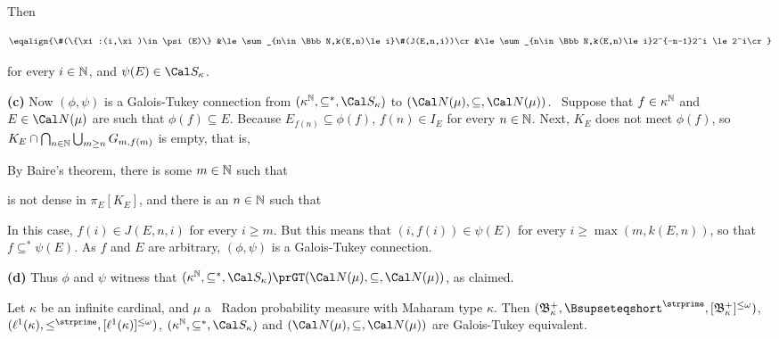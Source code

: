 {

\noindent Then

$$\eqalign{\#(\{\xi:(i,\xi)\in\psi(E)\}
&\le\sum_{n\in\Bbb N,k(E,n)\le i}\#(J(E,n,i))\cr
&\le\sum_{n\in\Bbb N,k(E,n)\le i}2^{-n-1}2^i
\le 2^i\cr}$$

\noindent for every $i\in\Bbb N$, and $\psi(E)\in\Cal S_{\kappa}$.

\medskip

{\bf (c)} Now $(\phi,\psi)$ is a Galois-Tukey connection from
$(\kappa^{\Bbb N},\subseteq^*,\Cal S_{\kappa})$ to
$(\Cal N(\mu),\subseteq,\Cal N(\mu))$.   \Prf\ Suppose that
$f\in\kappa^{\Bbb N}$ and $E\in\Cal N(\mu)$ are such that
$\phi(f)\subseteq E$.   Because $E_{f(n)}\subseteq\phi(f)$,
$f(n)\in I_E$ for every $n\in\Bbb N$.   Next, $K_E$ does not meet
$\phi(f)$, so $K_E\cap\bigcap_{n\in\Bbb N}\bigcup_{m\ge n}G_{m,f(m)}$ is
empty, that is,


\noindent By Baire's theorem, there is some $m\in\Bbb N$ such that


\noindent is not dense in $\pi_E[K_E]$, and there is an $n\in\Bbb N$
such that


\noindent In this case, $f(i)\in J(E,n,i)$ for every $i\ge m$.   But
this means that $(i,f(i))\in\psi(E)$ for every $i\ge\max(m,k(E,n))$, so
that $f\subseteq^*\psi(E)$.   As $f$ and $E$ are arbitrary,
$(\phi,\psi)$ is a Galois-Tukey connection.\ \Qed

\medskip

{\bf (d)} Thus $\phi$ and $\psi$ witness that
$(\kappa^{\Bbb N},\subseteq^*,\Cal S_{\kappa})
\prGT(\Cal N(\mu),\subseteq,\Cal N(\mu))$, as claimed.
}%

 Let $\kappa$ be an infinite cardinal, and $\mu$
a \Mth\ Radon probability measure with Maharam type $\kappa$.
Then $(\frak B_{\kappa}^+,\Bsupseteqshort^{\strprime},
  [\frak B_{\kappa}^+]^{\le\omega})$,
$(\ell^1(\kappa),
  \le^{\strprime},\penalty-100[\ell^1(\kappa)]^{\le\omega})$,
$(\kappa^{\Bbb N},\subseteq^*,\Cal S_{\kappa})$
and $(\Cal N(\mu),\subseteq\nobreak,\Cal N(\mu))$ are
Galois-Tukey equivalent.

